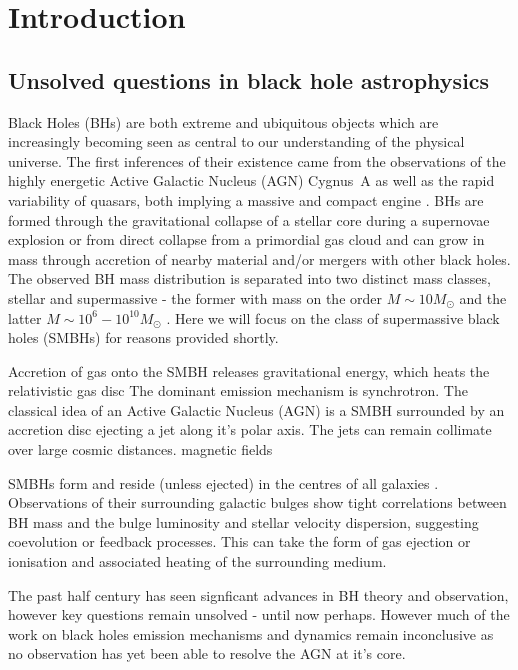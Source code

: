 \chapter{Introduction}

\section{Unsolved questions in black hole astrophysics}


Black Holes (BHs) are both extreme and ubiquitous objects which are increasingly becoming seen as central to our understanding of the physical universe. The first inferences of their existence came from the observations of the highly energetic Active Galactic Nucleus (AGN) Cygnus~A as well as the rapid variability of quasars, both implying a massive and compact engine \citep[][and references therein]{Narayan_2013}. BHs are formed through the gravitational collapse of a stellar core during a supernovae explosion or from direct collapse from a primordial gas cloud and can grow in mass through accretion of nearby material and/or mergers with other black holes. The observed BH mass distribution is separated into two distinct mass classes, stellar and supermassive - the former with mass on the order $M \sim 10 M_\odot$ and the latter $M \sim 10^6 - 10^{10} M_\odot$ \citep{Falcke_2013}. Here we will focus on the class of supermassive black holes (SMBHs) for reasons provided shortly.


Accretion of gas onto the SMBH releases gravitational energy, which heats the relativistic gas disc  The dominant emission mechanism is synchrotron. The classical idea of an Active Galactic Nucleus (AGN) is a SMBH surrounded by an accretion disc ejecting a jet along it's polar axis. The jets can remain collimate over large cosmic distances. magnetic fields

 
SMBHs form and reside (unless ejected) in the centres of all galaxies \citep{Kormendy_1995}. Observations of their surrounding galactic bulges show tight correlations between BH mass and the bulge luminosity and stellar velocity dispersion, suggesting coevolution or feedback processes. This can take the form of gas ejection or ionisation and associated heating of the surrounding medium. 


The past half century has seen signficant advances in BH theory and observation, however key questions remain unsolved - until now perhaps.
However much of the work on black holes emission mechanisms and dynamics remain inconclusive as no observation has yet been able to resolve the AGN at it's core. 



